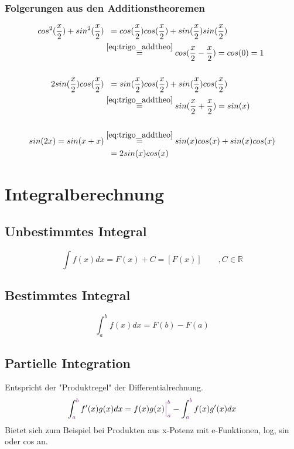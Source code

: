 \documentclass[12pt,a4paper]{article}%
\numberwithin{equation}{section}
\newcommand{\R}{\mathbb{R}} %
\def\colBord#1{\begingroup\color{Fuchsia}{#1}\endgroup}
\numberwithin{equation}{subsection}
\begin{document}
	  \subsubsection{Folgerungen aus den Additionstheoremen}
	  \begin{align}
	  cos^2(\frac{x}{2}) + sin^2(\frac{x}{2}) &\;\;= cos(\frac{x}{2}) cos(\frac{x}{2}) + sin(\frac{x}{2}) sin(\frac{x}{2})\\ 
	  &\overset{\eqref{eq:trigo_addtheo}}{=} cos(\frac{x}{2}-\frac{x}{2}) = cos(0) = 1\\
	  \\
	  2sin(\frac{x}{2})cos(\frac{x}{2}) &\;\;= sin(\frac{x}{2})cos(\frac{x}{2}) + sin(\frac{x}{2})cos(\frac{x}{2})\\
	  &\overset{\eqref{eq:trigo_addtheo}}{=} sin(\frac{x}{2}+ \frac{x}{2}) = sin(x)\\
	  \\
	  sin(2x) = sin(x+x) &\overset{\eqref{eq:trigo_addtheo}}{=} sin(x)cos(x) + sin(x)cos(x) \\
	  &\;\;=2sin(x)cos(x) \label{eq:trigo:addtheo_folg}
	  \end{align}
\newpage

\section{Integralberechnung}
\subsection{Unbestimmtes Integral}
\begin{equation}
\int f(x) dx = F(x) + C = [F(x)]\qquad, C\in\R \label{eq:def_noBorder}
\end{equation}

\subsection{Bestimmtes Integral}
\begin{equation}
\int_a^b f(x) dx = F(b) - F(a) \label{eq:def_border}
\end{equation}

\subsection{Partielle Integration}
Entspricht der "Produktregel" der Differentialrechnung.
\begin{equation}
\int_{\colBord{a}}^{\colBord{b}} f'(x) g(x) dx = f(x) g(x) \colBord{\Big|_a^b} - \int_{\colBord{a}}^{\colBord{b}} f(x) g'(x) dx \label{eq:rule_partInt}
\end{equation}
Bietet sich zum Beispiel bei Produkten aus x-Potenz mit e-Funktionen, log, sin oder cos an.
\end{document}
